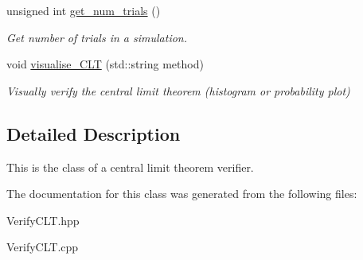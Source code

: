 \begin{DoxyCompactItemize}
\mbox{\label{classVerifyCLT_a9d1da86ba8a43b1fd7e28834d6a00213}} 
unsigned int \hyperlink{classVerifyCLT_a9d1da86ba8a43b1fd7e28834d6a00213}{get\+\_\+num\+\_\+trials} ()
\begin{DoxyCompactList}\small\item\em Get number of trials in a simulation. \end{DoxyCompactList}\item 
\mbox{\label{classVerifyCLT_ac0c51f5097e323fe3e4ddf8134a7d58b}} 
void \hyperlink{classVerifyCLT_ac0c51f5097e323fe3e4ddf8134a7d58b}{visualise\+\_\+\+C\+LT} (std\+::string method)
\begin{DoxyCompactList}\small\item\em Visually verify the central limit theorem (histogram or probability plot) \end{DoxyCompactList}\end{DoxyCompactItemize}


\subsection{Detailed Description}
This is the class of a central limit theorem verifier. 

The documentation for this class was generated from the following files\+:\begin{DoxyCompactItemize}
\item 
Verify\+C\+L\+T.\+hpp\item 
Verify\+C\+L\+T.\+cpp\end{DoxyCompactItemize}
